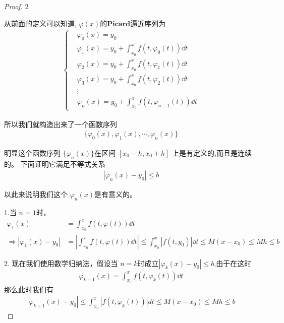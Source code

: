 \begin{proof}{\sf \color{orange} 2}\par
    从前面的定义可以知道, $\varphi(x)$\mbox{的}$\mathbf{Picard}$逼近序列为
    \begin{align*}
    \left\{\begin{aligned}
        &\varphi_0(x) = y_0\\
        &\varphi_1(x)  = y_0 + \int_{x_0}^{x}{f(t, \varphi_0(t)) \dd t}\\
        &\varphi_2(x)  = y_0 + \int_{x_0}^{x}{f(t, \varphi_1(t)) \dd t}\\
        &\varphi_3(x)  = y_0 + \int_{x_0}^{x}{f(t, \varphi_2(t)) \dd t}\\
        &\vdots\\
        &\varphi_{n}(x)  = y_0 + \int_{x_0}^{x}{f(t, \varphi_{n-1}(t)) \dd t}
        \label{PicardExample}
    \end{aligned}\right.
    \end{align*}

    所以我们就构造出来了一个函数序列
    \begin{align*}
        \bigg\{\varphi_0(x), \varphi_1(x), \cdots, \varphi_n(x)\bigg\}
    \end{align*}

    明显这个函数序列 $\{\varphi_n(x)\}$在区间 $[x_0-h, x_0+h]$ 上是有定义的,而且是连续的。
    下面证明它满足不等式关系
    \begin{align*}
        |\varphi_n(x)-y_0|\le b
    \end{align*}

    以此来说明我们这个 $\varphi_n(x)$是有意义的。

    1.当 $n=1$时，
    \begin{align*}
        \varphi_1(x)&=\int_{x_0}^{x}{f(t, \varphi(t)) \dd t}\\
        \Longrightarrow|\varphi_1(x)-y_0| &= \left|\int_{x_0}^{x}{f(t, \varphi(t)) \dd t}\right|\le \int_{x_0}^{x}{|f(t, y_0)| \dd t}
        \le M(x-x_0)\le Mh\le b
    \end{align*}

    2. 现在我们使用数学归纳法，假设当 $n=k$时成立$|\varphi_{k}(x)-y_0| \le b $,由于在这时
    \begin{align*}
        \varphi_{k+1}(x) = \int_{x_0}^{x}{f(t, \varphi_k(t)) \dd t}
    \end{align*}
    那么此时我们有
    \begin{align*}
        |\varphi_{k+1}(x) - y_0|\le \int_{x_0}^{x}{|f(t, \varphi_k(t)) |dt}\le M(x-x_0)\le Mh\le b
    \end{align*}
\end{proof}


